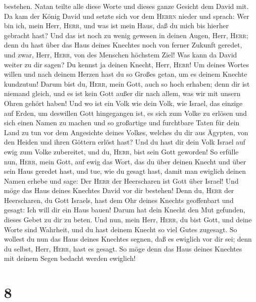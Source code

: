 bestehen.  Natan teilte alle diese Worte und dieses ganze
Gesicht dem David mit.  Da kam der König David und setzte
sich vor dem \textsc{Herrn} nieder und sprach: Wer bin ich, mein Herr,
\textsc{Herr}, und was ist mein Haus, daß du mich bis hierher gebracht
hast?  Und das ist noch zu wenig gewesen in deinen Augen,
Herr, \textsc{Herr}; denn du hast über das Haus deines Knechtes noch von
ferner Zukunft geredet, und zwar, Herr, \textsc{Herr}, von des Menschen
höchstem Ziel!  Was kann da David weiter zu dir sagen? Du
kennst ja deinen Knecht, Herr, \textsc{Herr}!  Um deines
Wortes willen und nach deinem Herzen hast du so Großes getan, um es
deinem Knechte kundzutun!  Darum bist du, \textsc{Herr},
mein Gott, auch so hoch erhaben; denn dir ist niemand gleich, und es ist
kein Gott außer dir nach allem, was wir mit unsern Ohren gehört haben!
 Und wo ist ein Volk wie dein Volk, wie Israel, das
einzige auf Erden, um deswillen Gott hingegangen ist, es sich zum Volke
zu erlösen und sich einen Namen zu machen und so großartige und
furchtbare Taten für dein Land zu tun vor dem Angesichte deines Volkes,
welches du dir aus Ägypten, von den Heiden und ihren Göttern erlöst
hast?  Und du hast dir dein Volk Israel auf ewig zum
Volke zubereitet, und du, \textsc{Herr}, bist sein Gott geworden!
 So erfülle nun, \textsc{Herr}, mein Gott, auf ewig das
Wort, das du über deinen Knecht und über sein Haus geredet hast, und
tue, wie du gesagt hast,  damit man ewiglich deinen Namen
erhebe und sage: Der \textsc{Herr} der Heerscharen ist Gott über Israel!
Und möge das Haus deines Knechtes David vor dir bestehen!
 Denn du, \textsc{Herr} der Heerscharen, du Gott Israels,
hast dem Ohr deines Knechts geoffenbart und gesagt: Ich will dir ein
Haus bauen! Darum hat dein Knecht den Mut gefunden, dieses Gebet zu dir
zu beten.  Und nun, mein Herr, \textsc{Herr}, du bist
Gott, und deine Worte sind Wahrheit, und du hast deinem Knecht so viel
Gutes zugesagt.  So wollest du nun das Haus deines
Knechtes segnen, daß es ewiglich vor dir sei; denn du selbst, Herr,
\textsc{Herr}, hast es gesagt. So möge denn das Haus deines Knechtes mit
deinem Segen bedacht werden ewiglich!

\hypertarget{section-7}{%
\section{8}\label{section-7}}


